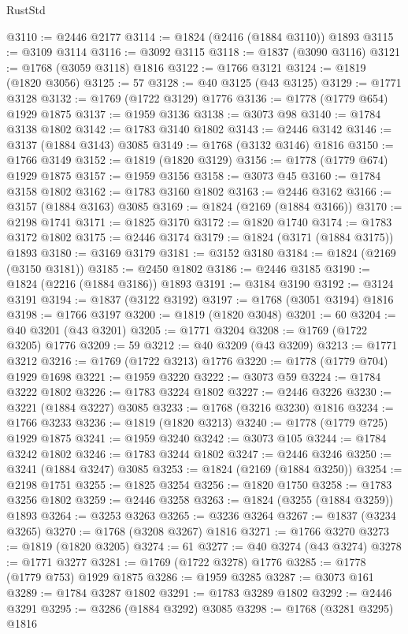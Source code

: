 \begin{lexlean}{RustStd}
\begin{coremodule}
{\begin{coremodule}
{{{{{{{{{{{{{{{{{{{{{{{{{{{{{{{{{{{{{{{{{{{{{{{@3110 := @2446 @2177
@3114 := @1824 (@2416 (@1884 @3110)) @1893
@3115 := @3109 @3114
@3116 := @3092 @3115
@3118 := @1837 (@3090 @3116)
@3121 := @1768 (@3059 @3118) @1816
@3122 := @1766 @3121
@3124 := @1819 (@1820 @3056)
@3125 := 57
@3128 := @40 @3125 (@43 @3125)
@3129 := @1771 @3128
@3132 := @1769 (@1722 @3129) @1776
@3136 := @1778 (@1779 @654) @1929 @1875
@3137 := @1959 @3136
@3138 := @3073 @98
@3140 := @1784 @3138 @1802
@3142 := @1783 @3140 @1802
@3143 := @2446 @3142
@3146 := @3137 (@1884 @3143) @3085
@3149 := @1768 (@3132 @3146) @1816
@3150 := @1766 @3149
@3152 := @1819 (@1820 @3129)
@3156 := @1778 (@1779 @674) @1929 @1875
@3157 := @1959 @3156
@3158 := @3073 @45
@3160 := @1784 @3158 @1802
@3162 := @1783 @3160 @1802
@3163 := @2446 @3162
@3166 := @3157 (@1884 @3163) @3085
@3169 := @1824 (@2169 (@1884 @3166))
@3170 := @2198 @1741
@3171 := @1825 @3170
@3172 := @1820 @1740
@3174 := @1783 @3172 @1802
@3175 := @2446 @3174
@3179 := @1824 (@3171 (@1884 @3175)) @1893
@3180 := @3169 @3179
@3181 := @3152 @3180
@3184 := @1824 (@2169 (@3150 @3181))
@3185 := @2450 @1802
@3186 := @2446 @3185
@3190 := @1824 (@2216 (@1884 @3186)) @1893
@3191 := @3184 @3190
@3192 := @3124 @3191
@3194 := @1837 (@3122 @3192)
@3197 := @1768 (@3051 @3194) @1816
@3198 := @1766 @3197
@3200 := @1819 (@1820 @3048)
@3201 := 60
@3204 := @40 @3201 (@43 @3201)
@3205 := @1771 @3204
@3208 := @1769 (@1722 @3205) @1776
@3209 := 59
@3212 := @40 @3209 (@43 @3209)
@3213 := @1771 @3212
@3216 := @1769 (@1722 @3213) @1776
@3220 := @1778 (@1779 @704) @1929 @1698
@3221 := @1959 @3220
@3222 := @3073 @59
@3224 := @1784 @3222 @1802
@3226 := @1783 @3224 @1802
@3227 := @2446 @3226
@3230 := @3221 (@1884 @3227) @3085
@3233 := @1768 (@3216 @3230) @1816
@3234 := @1766 @3233
@3236 := @1819 (@1820 @3213)
@3240 := @1778 (@1779 @725) @1929 @1875
@3241 := @1959 @3240
@3242 := @3073 @105
@3244 := @1784 @3242 @1802
@3246 := @1783 @3244 @1802
@3247 := @2446 @3246
@3250 := @3241 (@1884 @3247) @3085
@3253 := @1824 (@2169 (@1884 @3250))
@3254 := @2198 @1751
@3255 := @1825 @3254
@3256 := @1820 @1750
@3258 := @1783 @3256 @1802
@3259 := @2446 @3258
@3263 := @1824 (@3255 (@1884 @3259)) @1893
@3264 := @3253 @3263
@3265 := @3236 @3264
@3267 := @1837 (@3234 @3265)
@3270 := @1768 (@3208 @3267) @1816
@3271 := @1766 @3270
@3273 := @1819 (@1820 @3205)
@3274 := 61
@3277 := @40 @3274 (@43 @3274)
@3278 := @1771 @3277
@3281 := @1769 (@1722 @3278) @1776
@3285 := @1778 (@1779 @753) @1929 @1875
@3286 := @1959 @3285
@3287 := @3073 @161
@3289 := @1784 @3287 @1802
@3291 := @1783 @3289 @1802
@3292 := @2446 @3291
@3295 := @3286 (@1884 @3292) @3085
@3298 := @1768 (@3281 @3295) @1816
}}}}}}}}}}}}}}}}}}}}}}}}}}}}}}}}}}}}}}}}}}}}}}}
\end{coremodule}}
\end{coremodule}
\end{lexlean}
